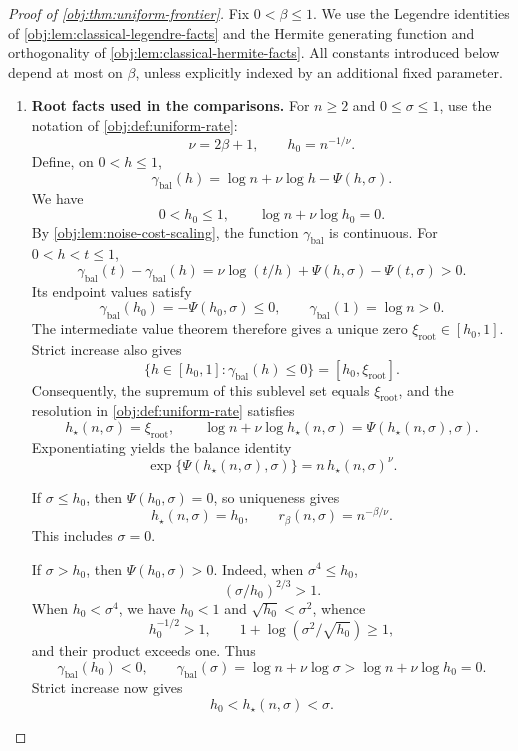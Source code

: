 \begin{proof}[Proof of \cref{obj:thm:uniform-frontier}]
Fix \(0<\beta\le1\). We use the Legendre identities of
\cref{obj:lem:classical-legendre-facts} and the Hermite generating function and orthogonality of
\cref{obj:lem:classical-hermite-facts}. All constants introduced below depend at most on \(\beta\), unless explicitly indexed by an additional fixed parameter.

\begin{enumerate}
\item \textbf{Root facts used in the comparisons.}
For \(n\ge2\) and \(0\le\sigma\le1\), use the notation of
\cref{obj:def:uniform-rate}:
\[
\nu=2\beta+1,\qquad h_0=n^{-1/\nu}.
\]
Define, on \(0<h\le1\),
\[
\gamma_{\mathrm{bal}}(h)
=\log n+\nu\log h-\Psi(h,\sigma).
\]
We have
\[
0<h_0\le1,\qquad
\log n+\nu\log h_0=0.
\]
By \cref{obj:lem:noise-cost-scaling}, the function
\(\gamma_{\mathrm{bal}}\) is continuous. For \(0<h<t\le1\),
\[
\gamma_{\mathrm{bal}}(t)-\gamma_{\mathrm{bal}}(h)
=\nu\log(t/h)+\Psi(h,\sigma)-\Psi(t,\sigma)>0.
\]
Its endpoint values satisfy
\[
\gamma_{\mathrm{bal}}(h_0)=-\Psi(h_0,\sigma)\le0,
\qquad
\gamma_{\mathrm{bal}}(1)=\log n>0.
\]
The intermediate value theorem therefore gives a unique zero
\(\xi_{\mathrm{root}}\in[h_0,1]\). Strict increase also gives
\[
\{h\in[h_0,1]:\gamma_{\mathrm{bal}}(h)\le0\}
=[h_0,\xi_{\mathrm{root}}].
\]
Consequently, the supremum of this sublevel set equals
\(\xi_{\mathrm{root}}\), and the resolution in
\cref{obj:def:uniform-rate} satisfies
\[
h_\star(n,\sigma)=\xi_{\mathrm{root}},
\qquad
\log n+\nu\log h_\star(n,\sigma)
=\Psi(h_\star(n,\sigma),\sigma).
\]
Exponentiating yields the balance identity
\[
\exp\{\Psi(h_\star(n,\sigma),\sigma)\}
=n\,h_\star(n,\sigma)^\nu.
\]

If \(\sigma\le h_0\), then \(\Psi(h_0,\sigma)=0\), so uniqueness gives
\[
h_\star(n,\sigma)=h_0,\qquad
r_\beta(n,\sigma)=n^{-\beta/\nu}.
\]
This includes \(\sigma=0\).

If \(\sigma>h_0\), then \(\Psi(h_0,\sigma)>0\). Indeed, when
\(\sigma^4\le h_0\),
\[
(\sigma/h_0)^{2/3}>1.
\]
When \(h_0<\sigma^4\), we have \(h_0<1\) and
\(\sqrt{h_0}<\sigma^2\), whence
\[
h_0^{-1/2}>1,\qquad
1+\log(\sigma^2/\sqrt{h_0})\ge1,
\]
and their product exceeds one. Thus
\[
\gamma_{\mathrm{bal}}(h_0)<0,
\qquad
\gamma_{\mathrm{bal}}(\sigma)
=\log n+\nu\log\sigma
>\log n+\nu\log h_0=0.
\]
Strict increase now gives
\[
h_0<h_\star(n,\sigma)<\sigma.
\]


\end{enumerate}
\end{proof}
